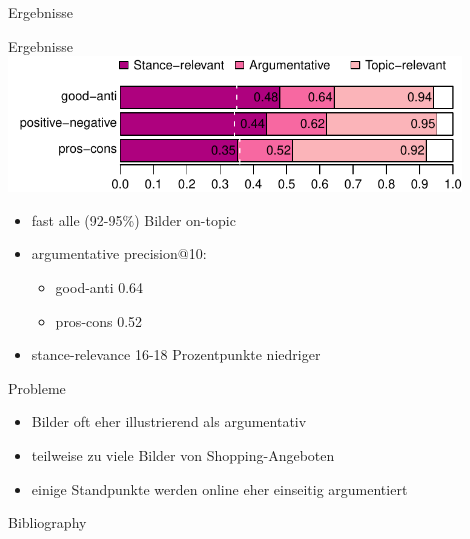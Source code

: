 \documentclass[usenames,dvipsnames]{beamer}
\begin{document}
	\begin{section}{Ergebnisse}
		\begin{frame}{Ergebnisse}
			\includegraphics[width=0.9\textwidth]{figures/by-method}
			\begin{itemize}
				\item fast alle (92-95\%) Bilder on-topic
				\item argumentative precision@10: \begin{itemize}
					\item good-anti 0.64
					\item pros-cons 0.52
				\end{itemize}
				\item stance-relevance 16-18 Prozentpunkte niedriger
			\end{itemize}
		\end{frame}
	
	\begin{frame}{Probleme}
		\begin{itemize}
			\item Bilder oft eher illustrierend als argumentativ
			\item teilweise zu viele Bilder von Shopping-Angeboten
			\item einige Standpunkte werden online eher einseitig argumentiert
		\end{itemize}
	\end{frame}
	\end{section}
	
	\begin{frame}[allowframebreaks]{Bibliography}
		\printbibliography
	\end{frame}
	
\end{document}
